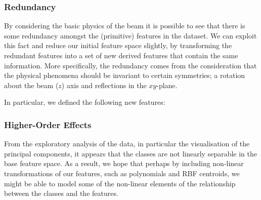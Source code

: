 \subsubsection{Redundancy}
By considering the basic physics of the beam it is possible to see that there is some redundancy amongst the (primitive) features in the dataset. We can exploit this fact and reduce our initial feature space slightly, by transforming the redundant features into a set of new derived features that contain the same information. 
More specifically, the redundancy comes from the consideration that the physical phenomena should be invariant to certain symmetries; a rotation about the beam ($z$) axis and reflections in the $xy$-plane.

In particular, we defined the following new features:

\subsubsection{Higher-Order Effects}
From the exploratory analysis of the data, in particular the visualisation of the principal components, it appears that the classes are not linearly separable in the base feature space. As a result, we hope that perhaps by including non-linear transformations of our features, such as polynomials and RBF centroids, we might be able to model some of the non-linear elements of the relationship between the classes and the features.

